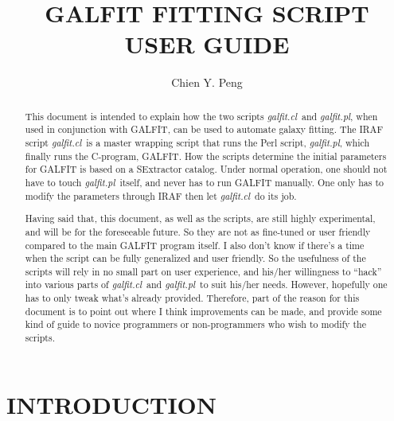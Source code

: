 \documentclass[preprint]{aastex}
\def\galfitcl{{\it galfit.cl}}
\def\galfitpl{{\it galfit.pl}}
\begin{document}

\title{GALFIT FITTING SCRIPT USER GUIDE}

\author {Chien Y. Peng}

\begin {abstract}

This document is intended to explain how the two scripts \galfitcl\  and
\galfitpl, when used in conjunction with GALFIT, can be used to automate
galaxy fitting.  The IRAF script \galfitcl\  is a master wrapping script
that runs the Perl script, \galfitpl, which finally runs the C-program,
GALFIT.  How the scripts determine the initial parameters for GALFIT is based
on a SExtractor catalog.  Under normal operation, one should not have to touch
\galfitpl\  itself, and never has to run GALFIT manually.  One only has to
modify the parameters through IRAF then let \galfitcl\  do its job.

Having said that, this document, as well as the scripts, are still highly
experimental, and will be for the foreseeable future.  So they are not as
fine-tuned or user friendly compared to the main GALFIT program itself.  I
also don't know if there's a time when the script can be fully generalized and
user friendly.  So the usefulness of the scripts will rely in no small part on
user experience, and his/her willingness to ``hack'' into various parts of
\galfitcl\ and \galfitpl\ to suit his/her needs.  However, hopefully one has
to only tweak what's already provided.  Therefore, part of the reason for this
document is to point out where I think improvements can be made, and provide
some kind of guide to novice programmers or non-programmers who wish to modify
the scripts.

\end {abstract}

\section {INTRODUCTION}
\end{document}

